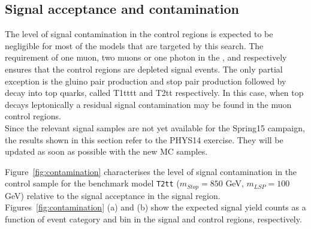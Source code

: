 \subsection{Signal acceptance and contamination}

The level of signal contamination in the control regions is expected to be negligible 
for most of the models that are targeted by this search. 
The requirement of one muon, two muons or one photon in the \mj, \mmj and \gj respectively 
ensures that the control regions are depleted signal events. 
The only partial exception is the gluino pair production and stop pair production followed by decay into top quarks, 
called T1tttt and T2tt respectively. 
In this case, when top decays leptonically a residual signal contamination may be found in the muon control regions. \\
Since the relevant signal samples are not yet available for the Spring15 campaign, the results shown in this section refer to the PHYS14 exercise. 
They will be updated as soon as possible with the new MC samples. 

Figure~\ref{fig:contamination} characterises the level of signal
contamination in the \mj control sample for the benchmark model
\texttt{T2tt} ($m_{Stop}=850$ GeV, $m_{LSP}=100$ GeV) relative to the signal acceptance in the
signal region. Figures~\ref{fig:contamination} (a) and (b) show the
expected signal yield counts as a function of event category and
\scalht bin in the signal and \mj control regions, respectively.

